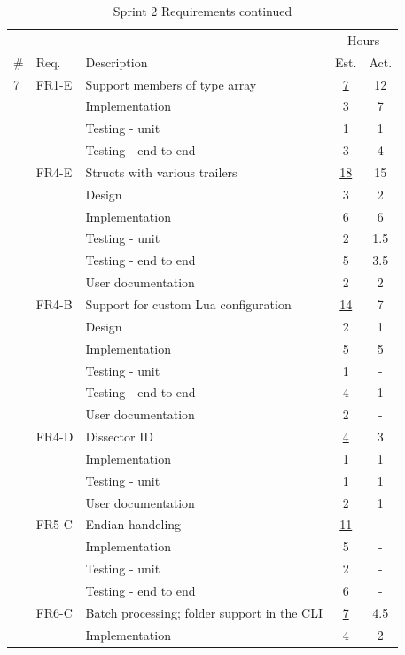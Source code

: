 \begin{table}[!ht] \small \center
\caption{Sprint 2 Requirements continued\label{tab:sprint2req2}}
\begin{tabularx}{\textwidth}{l l X c c}
	\toprule
	& & & \multicolumn{2}{c}{Hours} \\
	\cmidrule(r){4-5}
	\# & Req. & Description & Est. & Act. \\
	\midrule
	7 & FR1-E & Support members of type array & \underline{ 7 } & 12 \\
	   &  & Implementation & 3 & 7 \\
	   &  & Testing - unit & 1 & 1 \\
	   &  & Testing - end to end & 3 & 4 \\
	\addlinespace
	8 & FR4-E & Structs with various trailers & \underline{ 18 } & 15 \\
	   &  & Design & 3 & 2 \\
	   &  & Implementation & 6 & 6 \\
	   &  & Testing - unit & 2 & 1.5 \\
	   &  & Testing - end to end & 5 & 3.5 \\
	   &  & User documentation & 2 & 2 \\
	\addlinespace
	9 & FR4-B & Support for custom Lua configuration & \underline{ 14 } & 7 \\
	   &  & Design & 2 & 1 \\
	   &  & Implementation & 5 & 5 \\
	   &  & Testing - unit & 1 & - \\
	   &  & Testing - end to end & 4 & 1 \\
	   &  & User documentation & 2 & - \\
	\addlinespace
	10 & FR4-D & Dissector ID & \underline{ 4 } & 3 \\
	   &  & Implementation & 1 & 1 \\
	   &  & Testing - unit & 1 & 1 \\
	   &  & User documentation & 2 & 1 \\
	\addlinespace
	11 & FR5-C & Endian handeling & \underline{ 11 } & - \\
	   &  & Implementation & 5 & - \\
	   &  & Testing - unit & 2 & - \\
	   &  & Testing - end to end & 6 & - \\
	\addlinespace
	12 & FR6-C & Batch processing; folder support in the CLI & \underline{ 7 } & 4.5 \\
	   &  & Implementation & 4 & 2 \\

\end{tabularx}
\end{table}
